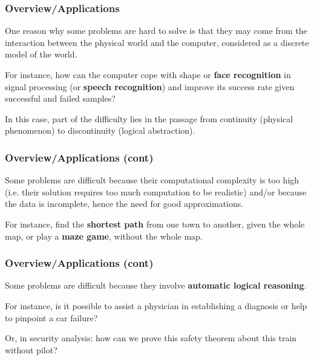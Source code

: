 %
\begin{frame}
\frametitle{Overview/Applications}

One reason why some problems are hard to solve is that they may come
from the interaction between the physical world and the computer,
considered as a discrete model of the world. 

\bigskip

For instance, how can the computer cope with shape or \textbf{face
recognition} in signal processing (or \textbf{speech recognition}) and
improve its success rate given successful and failed samples? 

\bigskip

In this case, part of the difficulty lies in the passage from
continuity (physical phenomenon) to discontinuity (logical
abstraction).

\end{frame}

%
\begin{frame}
\frametitle{Overview/Applications (cont)}

Some problems are difficult because their computational complexity is
too high (i.e. their solution requires too much computation to be
realistic) and/or because the data is incomplete, hence the need for
good approximations.

\bigskip

For instance, find the \textbf{shortest path} from one town to
another, given the whole map, or play a \textbf{maze game}, without
the whole map.

\end{frame}

%
\begin{frame}
\frametitle{Overview/Applications (cont)}

Some problems are difficult because they involve \textbf{automatic
logical reasoning}. 

\bigskip

For instance, is it possible to assist a physician in establishing a
diagnosis or help to pinpoint a car failure?

\bigskip

Or, in security analysis: how can we prove this safety theorem about
this train without pilot?

\end{frame}

